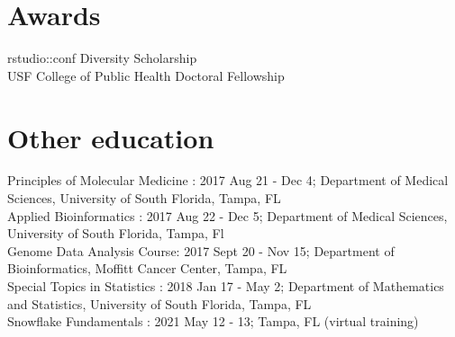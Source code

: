 \documentclass[11pt, a4paper]{article} %
\newcommand{\years}[1]{\marginnote{\scriptsize \raise .3ex\hbox{#1}}} %
\begin{document}
\section*{Awards}

\years{2018} rstudio::conf Diversity Scholarship \\
\years{2020--} USF College of Public Health Doctoral Fellowship \\


\section*{Other education}

Principles of Molecular Medicine : 2017 Aug 21 - Dec 4; Department of Medical Sciences, University of South Florida, Tampa, FL\\

Applied Bioinformatics : 2017 Aug 22 - Dec 5; Department of Medical Sciences, University of South Florida, Tampa, Fl \\

Genome Data Analysis Course:  2017 Sept 20 - Nov 15; Department of Bioinformatics, Moffitt Cancer Center, Tampa, FL \\

Special Topics in Statistics :  2018 Jan 17 -  May 2; Department of Mathematics and Statistics, University of South Florida, Tampa, FL\\

Snowflake Fundamentals : 2021 May 12 - 13; Tampa, FL (virtual training) 


\end{document}
